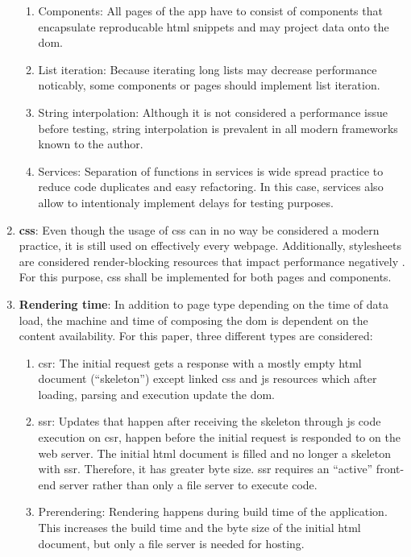 \documentclass[a4paper, 10pt]{article}
\begin{document}
\begin{enumerate}
  \begin{enumerate}
    \item Components: All pages of the app have to consist of components that encapsulate reproducable \acrshort{html} snippets and may project data onto the \acrshort{dom}.
    \item List iteration: Because iterating long lists may decrease performance noticably, some components or pages should implement list iteration.
    \item String interpolation: Although it is not considered a performance issue before testing, string interpolation is prevalent in all modern frameworks known to the author.
    \item Services: \label{enum:services} Separation of functions in services is wide spread practice to reduce code duplicates and easy refactoring.
    In this case, services also allow to intentionaly implement delays for testing purposes.
  \end{enumerate}
  
  \item \textbf{\acrshort{css}}: Even though the usage of \acrshort{css} can in no way be considered a modern practice, it is still used on effectively every webpage. %
  Additionally, stylesheets are considered render-blocking resources that impact performance negatively \citep{renderblocking,eliminateRenderBlocking}.
  For this purpose, \acrshort{css} shall be implemented for both pages and components.
  
  \item \textbf{Rendering time}: In addition to page type depending on the time of data load, the machine and time of composing the \acrshort{dom} is dependent on the content availability.
  For this paper, three different types are considered:
  \begin{enumerate}
    \item \acrfull{csr}: The initial request gets a response with a mostly empty \acrshort{html} document (\enquote{skeleton}) except linked \acrshort{css} and \acrshort{js} resources which after loading, parsing and execution update the \acrshort{dom}.
    \item \acrfull{ssr}: Updates that happen after receiving the skeleton through \acrshort{js} code execution on \acrshort{csr}, happen before the initial request is responded to on the web server.
    The initial \acrshort{html} document is filled and no longer a skeleton with \acrshort{ssr}.
    Therefore, it has greater byte size.
    \acrlong{ssr} requires an \enquote{active} front-end server rather than only a file server to execute code.
    \item Prerendering: Rendering happens during build time of the application.
    This increases the build time and the byte size of the initial \acrshort{html} document, but only a file server is needed for hosting.
  \end{enumerate}


\end{enumerate}
\end{document}
